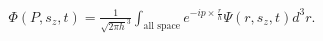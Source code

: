\begin{align*}
  \Phi (P, s_z, t) = \frac{1}{\sqrt{2\pi h}^{3}} \int_\textrm{all space} e^{-ip \times \frac{r}{h}}
  \Psi (r, s_z, t)d^{3} r
.\end{align*}
